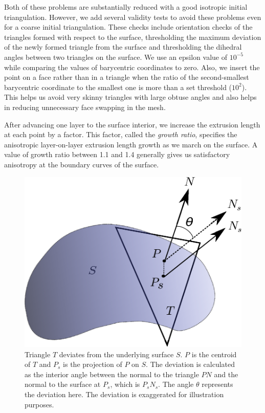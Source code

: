 Both of these problems are substantially reduced with a good isotropic initial triangulation. However, we add several validity tests to avoid these problems even for a coarse initial triangulation. These checks include orientation checks of the triangles formed with respect to the surface, thresholding the maximum deviation of the newly formed triangle from the surface and thresholding the dihedral angles between two triangles on the surface. We use an epsilon value of $10^{-5}$ while comparing the values of barycentric coordinates to zero. Also, we insert the point on a face rather than in a triangle when the ratio of the second-smallest barycentric coordinate to the smallest one is more than a set threshold ($10^2$). This helps us avoid very skinny triangles with large obtuse angles and also helps in reducing unnecessary face swapping in the mesh.

After advancing one layer to the surface interior, we increase the extrusion length at each point by a factor. This factor, called the \textit{growth ratio}, specifies the anisotropic layer-on-layer extrusion length growth as we march on the surface. A value of growth ratio between 1.1 and 1.4 generally gives us satisfactory anisotropy at the boundary curves of the surface.


\begin{figure}[!hbt]
    \centering
    \includegraphics[width=.5\textwidth]{img/m1/deviate-surface.eps}
    \caption{Triangle $T$ deviates from the underlying surface $S$. $P$ is the centroid of $T$ and $P_s$ is the projection of $P$ on $S$. The deviation is calculated as the interior angle between the normal to the triangle $PN$ and the normal to the surface at $P_s$, which is $P_sN_s$. The angle $\theta$ represents the deviation here. The deviation is exaggerated for illustration purposes.}
    \label{deviation-surface}
\end{figure}

